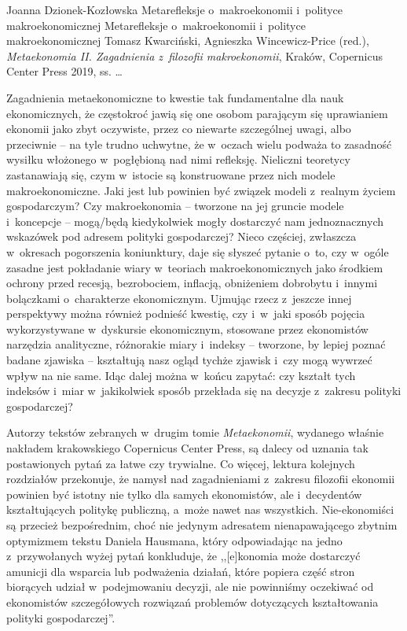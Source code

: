 \begin{recplenv}{Joanna Dzionek-Kozłowska}
	{Metarefleksje o~makroekonomii i~polityce makroekonomicznej}
	{Metarefleksje o~makroekonomii i~polityce makroekonomicznej}
	{Tomasz Kwarciński, Agnieszka Wincewicz-Price (red.), \textit{Metaekonomia II. Zagadnienia z~filozofii makroekonomii},
		Kraków, Copernicus Center Press 2019, ss. \ldots}





Zagadnienia metaekonomiczne to kwestie tak fundamentalne dla nauk ekonomicznych, że częstokroć jawią się one osobom
parającym się uprawianiem ekonomii jako zbyt oczywiste, przez co niewarte szczególnej uwagi, albo przeciwnie -- na tyle
trudno uchwytne, że w~oczach wielu podważa to zasadność wysiłku włożonego w~pogłębioną nad nimi refleksję. Nieliczni
teoretycy zastanawiają się, czym w~istocie są konstruowane przez nich modele makroekonomiczne. Jaki jest lub powinien
być związek modeli z~realnym życiem gospodarczym? Czy makroekonomia -- tworzone na jej gruncie
modele i~koncepcje -- \mbox{mogą/będą} kiedykolwiek
mogły dostarczyć nam jednoznacznych wskazówek pod adresem polityki gospodarczej? Nieco częściej,
zwłaszcza w~okresach pogorszenia koniunktury, daje się słyszeć pytanie o~to, czy w~ogóle zasadne jest pokładanie wiary
w~teoriach makroekonomicznych jako środkiem ochrony przed recesją, bezrobociem, inflacją, obniżeniem dobrobytu i~innymi
bolączkami o~charakterze ekonomicznym. Ujmując rzecz z~jeszcze innej perspektywy można również podnieść kwestię,
czy i~w~jaki sposób pojęcia wykorzystywane w~dyskursie ekonomicznym, stosowane przez ekonomistów narzędzia analityczne,
różnorakie miary i~indeksy -- tworzone, by lepiej poznać badane zjawiska -- kształtują nasz ogląd tychże zjawisk i~czy
mogą wywrzeć wpływ na nie same. Idąc dalej można w~końcu zapytać: czy kształt tych indeksów i~miar w~jakikolwiek sposób
przekłada się na decyzje z~zakresu polityki gospodarczej? 

Autorzy tekstów zebranych w~drugim tomie \textit{Metaekonomii}, wydanego właśnie nakładem krakowskiego Copernicus Center
Press, są dalecy od uznania tak postawionych pytań za łatwe czy trywialne. Co więcej, lektura kolejnych rozdziałów
przekonuje, że namysł nad zagadnieniami z~zakresu filozofii ekonomii powinien być istotny nie tylko dla samych
ekonomistów, ale i~decydentów kształtujących politykę publiczną, a~może nawet nas wszystkich. Nie-ekonomiści są
przecież bezpośrednim, choć nie jedynym adresatem nienapawającego zbytnim optymizmem tekstu Daniela Hausmana, który
odpowiadając na jedno z~przywołanych wyżej pytań konkluduje, że ,,[e]konomia może dostarczyć amunicji dla wsparcia lub
podważenia działań, które popiera część stron biorących udział w~podejmowaniu decyzji, ale nie powinniśmy oczekiwać od
ekonomistów szczegółowych rozwiązań problemów dotyczących kształtowania polityki gospodarczej''.


\end{recplenv}
